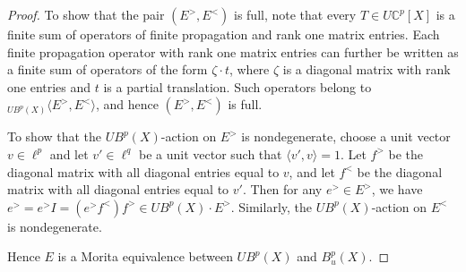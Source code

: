 \documentclass[a4,11pt]{amsart}
\theoremstyle{remark}
\begin{document}
\begin{proof}
To show that the pair $(E^>,E^<)$ is full, note that every $T\in U\mathbb{C}^p[X]$ is a finite sum of operators of finite propagation and rank one matrix entries.
Each finite propagation operator with rank one matrix entries can further be written as a finite sum of operators of the form $\zeta\cdot t$, where $\zeta$ is a diagonal matrix with rank one entries and $t$ is a partial translation.
Such operators belong to ${_{UB^p(X)}}\langle E^>,E^< \rangle$, and hence $(E^>,E^<)$ is full.

To show that the $UB^p(X)$-action on $E^>$ is nondegenerate, choose a unit vector $v\in\ell^p$ and let $v'\in\ell^q$ be a unit vector such that $\langle v',v \rangle=1$.
Let $f^>$ be the diagonal matrix with all diagonal entries equal to $v$, and let $f^<$ be the diagonal matrix with all diagonal entries equal to $v'$.
Then for any $e^>\in E^>$, we have $e^>=e^>I=(e^>f^<)f^>\in UB^p(X)\cdot E^>$.
Similarly, the $UB^p(X)$-action on $E^<$ is nondegenerate.

Hence $E$ is a Morita equivalence between $UB^p(X)$ and $B^p_u(X)$.

%
%
\end{proof}
\end{document}
